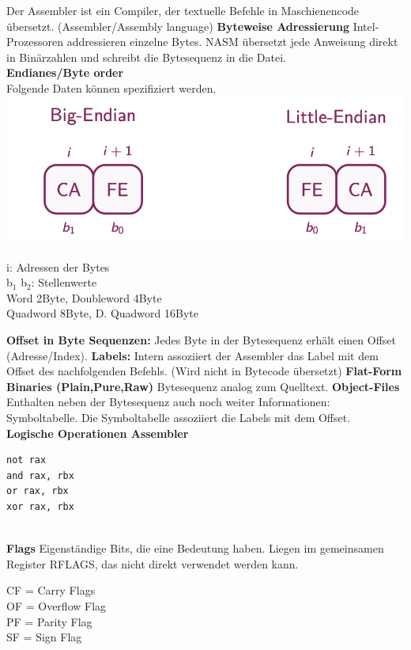 \documentclass[7pt,landscape,a4paper]{scrartcl}
\begin{document}
\begin{multicols*}{4}
Der Assembler ist ein Compiler, der textuelle Befehle in Maschienencode übersetzt. (Assembler/Assembly language)
\textbf{Byteweise Adressierung} Intel-Prozessoren addressieren einzelne Bytes. NASM übersetzt jede Anweisung direkt in Binärzahlen und schreibt die Bytesequenz in die Datei.\\
\textbf{Endianes/Byte order}\\
Folgende Daten können spezifiziert werden.\\
\includegraphics[width=0.45\linewidth]{endian}
\begin{minipage}[b]{0,5\linewidth}
i: Adressen der Bytes\\
b$_{1}$ b$_{2}$: Stellenwerte\\
Word 2Byte, Doubleword 4Byte\\ Quadword 8Byte, D. Quadword 16Byte
\end{minipage}
\textbf{Offset in Byte Sequenzen:} Jedes Byte in der Bytesequenz erhält einen Offset (Adresse/Index). 
\textbf{Labels:} Intern assoziiert der Assembler das Label mit dem Offset des nachfolgenden Befehls. (Wird nicht in Bytecode übersetzt)
\textbf{Flat-Form Binaries (Plain,Pure,Raw)} Bytesequenz analog zum Quelltext.
\textbf{Object-Files} Enthalten neben der Bytesequenz auch noch weiter Informationen: Symboltabelle. Die Symboltabelle assoziiert die Labels mit dem Offset.\\
\textbf{Logische Operationen Assembler}\\
\begin{minipage}[b]{0,3\linewidth}
\begin{verbatim}
not rax
and rax, rbx
or rax, rbx
xor rax, rbx
\end{verbatim}
\end{minipage}\\
\textbf{Flags}
Eigenständige Bits, die eine Bedeutung haben. Liegen im gemeinsamen Register RFLAGS, das nicht direkt verwendet werden kann.\\
\begin{minipage}[b]{0,3\linewidth}
CF = Carry Flags\\
OF = Overflow Flag\\
PF = Parity Flag\\
SF = Sign Flag\\

\end{minipage}
\end{multicols*}
\end{document}
